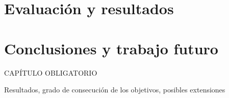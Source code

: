 \documentclass[oneside,12pt]{book}
\begin{document}
\chapter{Evaluación y resultados}


\chapter{Conclusiones y trabajo futuro}
%
CAPÍTULO OBLIGATORIO

Resultados,  grado  de  consecución  de  los  objetivos,  posibles extensiones
\newpage


\end{document}
